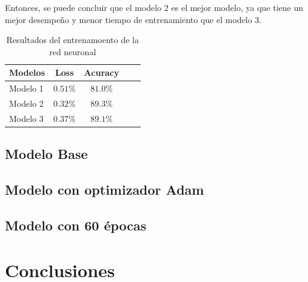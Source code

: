 \documentclass[aps,prl,reprint,groupedaddress]{revtex4-2}
\begin{document}
Entonces, se puede concluir que el modelo 2 es el mejor modelo, ya que tiene un
mejor desempeño y menor tiempo de entrenamiento que el modelo 3.

\begin{table}[h!]
  \begin{tabular}{lccll}
    \hline
    Modelos   & Loss      & Acuracy  & \\ \hline
    Modelo 1  & $0.51\% $ & $81.0\%$ & \\
    Modelo 2  & $0.32\% $ & $89.3\%$ & \\
    Modelo 3  & $0.37\% $ & $89.1\%$ & \\ \hline
  \end{tabular}
  \caption{Resultados del entrenamoento de la red neuronal}
  \label{tab:models}
\end{table}

\subsection{Modelo Base}

\subsection{Modelo con optimizador Adam}

\subsection{Modelo con 60 épocas}



\section{Conclusiones}




\end{document}
